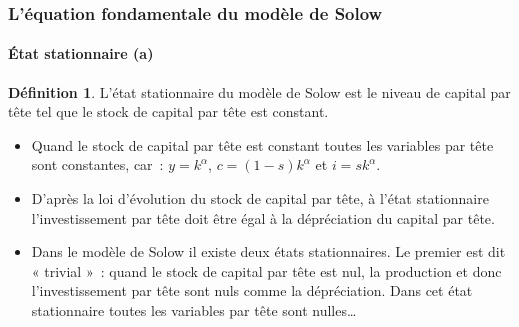 \documentclass[10pt,notheorems]{beamer}
\theoremstyle{plain}
\theoremstyle{definition} %
\newtheorem{definition}{Définition}
\begin{document}
\begin{frame}
  \frametitle{L'équation fondamentale du modèle de Solow}
  \framesubtitle{État stationnaire (a)}

  \bigskip

  \begin{definition}
    L'état stationnaire du modèle de Solow est le niveau de capital par tête tel que le stock de capital par tête est constant.
  \end{definition}

  \bigskip

  \begin{itemize}

  \item Quand le stock de capital par tête est constant toutes les variables par tête sont constantes, car~:
    $y = k^{\alpha}$, $c = (1-s)k^{\alpha}$ et $i = sk^{\alpha}$.\newline

  \item D'après la loi d'évolution du stock de capital par tête, à l'état stationnaire l'investissement par tête doit être égal à la dépréciation du capital par tête.\newline

  \item Dans le modèle de Solow il existe deux états stationnaires. Le premier est dit « trivial »~: quand le stock de capital par tête est nul, la production et donc l'investissement par tête sont nuls comme la dépréciation. Dans cet état stationnaire toutes les variables par tête sont nulles\ldots\newline

  \end{itemize}

\end{frame}
\end{document}
